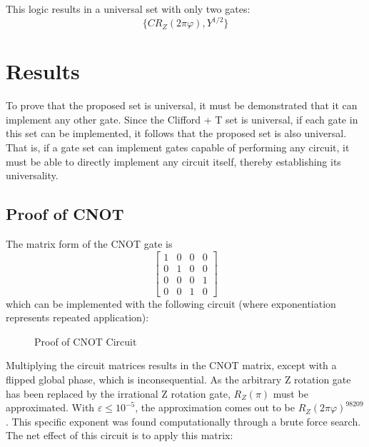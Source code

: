 \documentclass[12pt]{article}
\begin{document}
This logic results in a universal set with only two gates:
$$\{CR_Z(2\pi\varphi), Y^{1/2}\}$$

\section{Results}
To prove that the proposed set is universal, it must be demonstrated that it can implement any other gate. Since the Clifford + T set is universal, if each gate in this set can be implemented, it follows that the proposed set is also universal. That is, if a gate set can implement gates capable of performing any circuit, it must be able to directly implement any circuit itself, thereby establishing its universality.

\subsection{Proof of CNOT}
The matrix form of the CNOT gate is
$$
\begin{bmatrix}
    1&0&0&0\\
    0&1&0&0\\
    0&0&0&1\\
    0&0&1&0
\end{bmatrix}
$$
which can be implemented with the following circuit (where exponentiation represents repeated application):
\begin{figure}[ht]
    \centering
    \caption{Proof of CNOT Circuit}
    \label{fig:quantum universal set 1 proof of CNOT circuit algebraic}
\end{figure}

Multiplying the circuit matrices results in the CNOT matrix, except with a flipped global phase, which is inconsequential. As the arbitrary Z rotation gate has been replaced by the irrational Z rotation gate, $R_Z(\pi)$ must be approximated. With $\varepsilon \le 10^{-5}$, the approximation comes out to be $R_Z(2\pi\varphi)^{98209}$. This specific exponent was found computationally through a brute force search. The net effect of this circuit is to apply this matrix:
\end{document}
